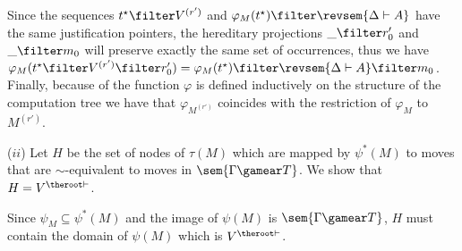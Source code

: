 Since the sequences $t^\star \filter V^{(r')}$ and  $\varphi_M(t^\star) \filter \revsem{\Delta \vdash A }$ have the same justification pointers,
the hereditary projections $\_ \filter r'_0$ and $\_ \filter  m_0$ will preserve exactly the same set of occurrences, thus we have
$\varphi_{M}(t^\star \filter V^{(r')} \filter r'_0) = \varphi_M(t^\star) \filter \revsem{\Delta \vdash A} \filter m_0$.
Finally, because of the function $\varphi$ is defined inductively on the structure of the computation tree we have that $\varphi_{M^{(r')}}$ coincides with the restriction of $\varphi_{M}$ to $M^{(r')}$.


($ii$) Let $H$ be the set of nodes of $\tau(M)$ which are mapped by
$\psi^*(M)$ to moves that are $\sim$-equivalent to moves in
$\sem{\Gamma \gamear T}$. We show that $H = V^{\theroot\vdash}$.

Since $\psi_M \subseteq \psi^*(M)$ and the image of $\psi(M)$ is
$\sem{\Gamma \gamear T}$, $H$ must contain the domain of
$\psi(M)$ which is $V^{\theroot\vdash}$.

